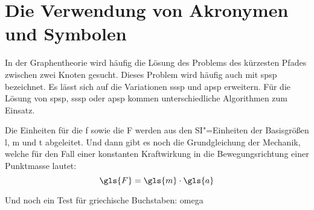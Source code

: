 \documentclass[english,ngerman]{tudscrreprt}
\begin{document}
\printacronyms[style=acrotabu]
\printsymbols[style=symbsplitlongtabu]

\clearpage

\section*{Die Verwendung von Akronymen und Symbolen}

In der Graphentheorie wird häufig die Lösung des Problems des kürzesten
Pfades zwischen zwei Knoten gesucht. Dieses Problem wird häufig auch
mit \gls{spsp} bezeichnet. Es lässt sich auf die Variationen \gls{sssp}
und \gls{apsp} erweitern. Für die Lösung von \gls{spsp}, \gls{sssp}
oder \gls{apsp} kommen unterschiedliche Algorithmen zum Einsatz.



Die Einheiten für die \gls{f} sowie die \gls{F} werden aus den
SI"=Einheiten der Basisgrößen \gls{l}, \gls{m} und \gls{t} abgeleitet.
Und dann gibt es noch die Grundgleichung der Mechanik, welche für den
Fall einer konstanten Kraftwirkung in die Bewegungsrichtung einer
Punktmasse lautet:
\[\gls{F} = \gls{m} \cdot \gls{a}\]

Und noch ein Test für griechische Buchstaben: \gls{omega}
\end{document}
